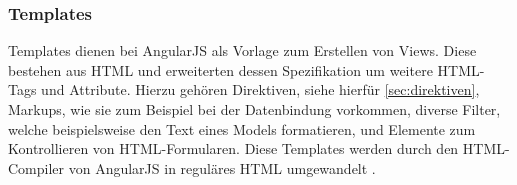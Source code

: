 \subsubsection{Templates}
Templates dienen bei AngularJS als Vorlage zum Erstellen von Views. Diese bestehen aus HTML und erweiterten dessen Spezifikation um weitere HTML-Tags und Attribute. Hierzu gehören Direktiven, siehe hierfür \autoref{sec:direktiven}, Markups, wie sie zum Beispiel bei der Datenbindung vorkommen, diverse Filter, welche beispielsweise den Text eines Models formatieren, und Elemente zum Kontrollieren von HTML-Formularen. Diese Templates werden durch den HTML-Compiler von AngularJS in reguläres HTML umgewandelt \cite{angularDoc}.